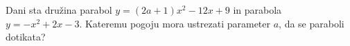 \documentclass[addpoints]{exam}
\begin{document}
\begin{questions}


\newpage

    \question[5]
        Dani sta družina parabol $y=(2a+1)x^2-12x+9$ in parabola $y=-x^2+2x-3$.
        Kateremu pogoju mora ustrezati parameter $a$, da se paraboli dotikata?

            \begin{solution}[9cm]

            \end{solution}


        


\end{questions}
\end{document}
